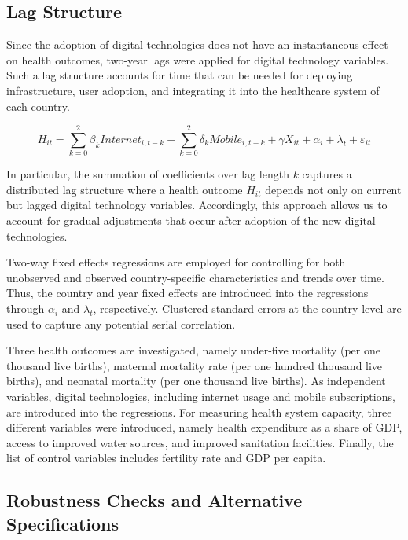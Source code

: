 \documentclass[12pt]{article}
\begin{document}
\subsection{Lag Structure}

Since the adoption of digital technologies does not have an instantaneous effect on health outcomes, two-year lags were applied for digital technology variables. Such a lag structure accounts for time that can be needed for deploying infrastructure, user adoption, and integrating it into the healthcare system of each country.

\begin{equation}
H_{it} =
\sum_{k=0}^{2}\beta_k Internet_{i,t-k}
+
\sum_{k=0}^{2}\delta_k Mobile_{i,t-k}
+
\gamma X_{it}
+
\alpha_i
+
\lambda_t
+
\varepsilon_{it}
\label{eq:lag}
\end{equation}

In particular, the summation of coefficients over lag length $k$ captures a distributed lag structure where a health outcome $H_{it}$ depends not only on current but lagged digital technology variables. Accordingly, this approach allows us to account for gradual adjustments that occur after adoption of the new digital technologies.

\medskip
Two-way fixed effects regressions are employed for controlling for both unobserved and observed country-specific characteristics and trends over time. Thus, the country and year fixed effects are introduced into the regressions through $\alpha_i$ and $\lambda_t$, respectively. Clustered standard errors at the country-level are used to capture any potential serial correlation.

\medskip
Three health outcomes are investigated, namely under-five mortality (per one thousand live births), maternal mortality rate (per one hundred thousand live births), and neonatal mortality (per one thousand live births). As independent variables, digital technologies, including internet usage and mobile subscriptions, are introduced into the regressions. For measuring health system capacity, three different variables were introduced, namely health expenditure as a share of GDP, access to improved water sources, and improved sanitation facilities. Finally, the list of control variables includes fertility rate and GDP per capita.

\subsection{Robustness Checks and Alternative Specifications}
\end{document}
